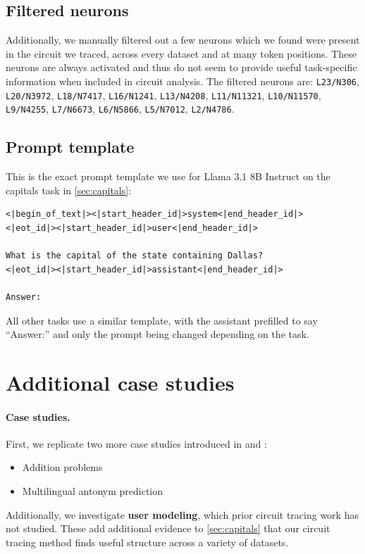 \documentclass{article}
\theoremstyle{plain}
\theoremstyle{definition}
\theoremstyle{remark}
\begin{document}
\subsection{Filtered neurons}
\label{sec:filtered}
Additionally, we manually filtered out a few neurons which we found were present in the circuit we traced, across every dataset and at many token positions.
These neurons are always activated and thus do not seem to provide useful task-specific information when included in circuit analysis.
The filtered neurons are: \texttt{L23/N306}, \texttt{L20/N3972}, \texttt{L18/N7417}, \texttt{L16/N1241}, \texttt{L13/N4208}, \texttt{L11/N11321}, \texttt{L10/N11570}, \texttt{L9/N4255}, \texttt{L7/N6673}, \texttt{L6/N5866}, \texttt{L5/N7012}, \texttt{L2/N4786}.

\subsection{Prompt template}

This is the exact prompt template we use for Llama 3.1 8B Instruct on the capitals task in \cref{sec:capitals}:

\begin{verbatim}
<|begin_of_text|><|start_header_id|>system<|end_header_id|>
<|eot_id|><|start_header_id|>user<|end_header_id|>

What is the capital of the state containing Dallas?
<|eot_id|><|start_header_id|>assistant<|end_header_id|>

Answer:
\end{verbatim}
\vspace{1em}

All other tasks use a similar template, with the assistant prefilled to say ``Answer:'' and only the prompt being changed depending on the task.

\newpage
\section{Additional case studies}
\label{sec:case-studies-more}

\paragraph{Case studies.} First, we replicate two more case studies introduced in \citet{lindsey2025biology} and \citet{ameisen2025circuit}:
\begin{itemize}
    \item Addition problems
    \item Multilingual antonym prediction
\end{itemize}
Additionally, we investigate \textbf{user modeling},
which prior circuit tracing work has not studied.
These add additional evidence to \cref{sec:capitals} that our circuit tracing method finds useful structure across a variety of datasets.
\end{document}
